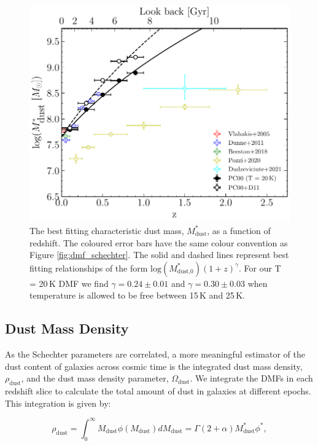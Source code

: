 \begin{figure}
	\centering
	\includegraphics[width=0.75\columnwidth]{Figures/dmf_m_evolution.pdf}
	\caption{The best fitting characteristic dust mass, $M_\textrm{dust}^*$, as a function of redshift. The coloured error bars have the same colour convention as Figure \ref{fig:dmf_schechter}. The solid and dashed lines represent best fitting relationships of the form $\textrm{log}(M_{\textrm{dust,0}}^*)(1+z)^\gamma$. For our T = 20\,K DMF we find $\gamma = 0.24\pm0.01$ and $\gamma = 0.30\pm0.03$ when temperature is allowed to be free between 15\,K and 25\,K.}
	\label{fig:dmf_m_evolution}
\end{figure}

\subsection{Dust Mass Density}

As the Schechter parameters are correlated, a more meaningful estimator of the dust content of galaxies across cosmic time is the integrated dust mass density, $\rho_{\textrm{dust}}$, and the dust mass density parameter, $\Omega_{\textrm{dust}}$. We integrate the DMFs in each redshift slice to calculate the total amount of dust in galaxies at different epochs. This integration is given by:

\begin{equation}
    \rho_{\textrm{dust}} = \int_0^\infty M_{\textrm{dust}} \phi(M_{\textrm{dust}}) dM_{\textrm{dust}} = \Gamma(2+\alpha) M_{\textrm{dust}}^* \phi^*,
    \label{eq:dust_mass_density}
\end{equation}

